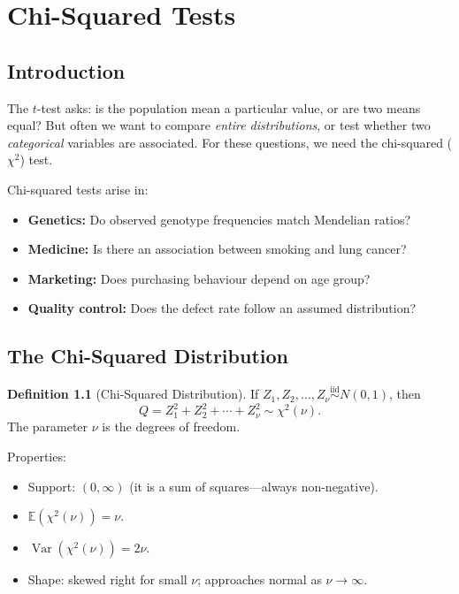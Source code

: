 \documentclass[12pt, a4paper, oneside]{book}
\theoremstyle{definition}
\newtheorem{definition}{Definition}[section]
\theoremstyle{plain}
\theoremstyle{remark}
\newcommand{\E}{\mathbb{E}}
\newcommand{\Var}{\operatorname{Var}}
\newcommand{\iid}{\overset{\text{iid}}{\sim}}
\begin{document}
\chapter{Chi-Squared Tests}
\label{ch:chi}

\section{Introduction}

The $t$-test asks: is the population mean a particular value, or are two
means equal?  But often we want to compare \emph{entire distributions}, or
test whether two \emph{categorical} variables are associated.  For these
questions, we need the chi-squared ($\chi^2$) test.

Chi-squared tests arise in:
\begin{itemize}
  \item \textbf{Genetics:} Do observed genotype frequencies match Mendelian
        ratios?
  \item \textbf{Medicine:} Is there an association between smoking and lung cancer?
  \item \textbf{Marketing:} Does purchasing behaviour depend on age group?
  \item \textbf{Quality control:} Does the defect rate follow an assumed distribution?
\end{itemize}

\section{The Chi-Squared Distribution}
\label{sec:chi-dist}

\begin{definition}[Chi-Squared Distribution]
If $Z_1,Z_2,\ldots,Z_\nu \iid N(0,1)$, then
\[
  Q = Z_1^2 + Z_2^2 + \cdots + Z_\nu^2 \sim \chi^2(\nu).
\]
The parameter $\nu$ is the degrees of freedom.
\end{definition}

Properties:
\begin{itemize}
  \item Support: $(0,\infty)$ (it is a sum of squares---always non-negative).
  \item $\E(\chi^2(\nu)) = \nu$.
  \item $\Var(\chi^2(\nu)) = 2\nu$.
  \item Shape: skewed right for small $\nu$; approaches normal as $\nu\to\infty$.
\end{itemize}
\end{document}

